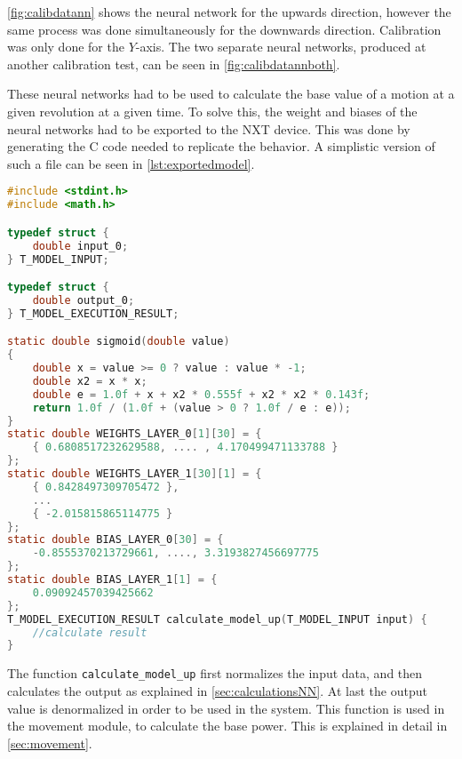 
\autoref{fig:calibdatann} shows the neural network for the upwards direction, however the same process was done simultaneously for the downwards direction.
Calibration was only done for the $Y$-axis.
The two separate neural networks, produced at another calibration test, can be seen in \autoref{fig:calibdatannboth}.



These neural networks had to be used to calculate the base value of a motion at a given revolution at a given time.
To solve this, the weight and biases of the neural networks had to be exported to the NXT device.
This was done by generating the C code needed to replicate the behavior.
A simplistic version of such a file can be seen in \autoref{lst:exportedmodel}.


\begin{lstlisting}[language=C,label={lst:exportedmodel},firstnumber={1},caption={Autogenerated model for getting power to move up}]
#include <stdint.h>
#include <math.h>

typedef struct {
	double input_0;
} T_MODEL_INPUT;

typedef struct {
	double output_0;
} T_MODEL_EXECUTION_RESULT;

static double sigmoid(double value)
{
	double x = value >= 0 ? value : value * -1;
	double x2 = x * x;
	double e = 1.0f + x + x2 * 0.555f + x2 * x2 * 0.143f;
	return 1.0f / (1.0f + (value > 0 ? 1.0f / e : e));
}
static double WEIGHTS_LAYER_0[1][30] = {
	{ 0.6808517232629588, .... , 4.170499471133788 }
};
static double WEIGHTS_LAYER_1[30][1] = {
	{ 0.8428497309705472 },
	...
	{ -2.015815865114775 }
};
static double BIAS_LAYER_0[30] = {
	-0.8555370213729661, ...., 3.3193827456697775
};
static double BIAS_LAYER_1[1] = {
	0.09092457039425662
};
T_MODEL_EXECUTION_RESULT calculate_model_up(T_MODEL_INPUT input) {
	//calculate result
}

\end{lstlisting}
The function \texttt{calculate\_model\_up} first normalizes the input data, and then calculates the output as explained in \ref{sec:calculationsNN}.
At last the output value is denormalized in order to be used in the system.
This function is used in the movement module, to calculate the base power.
This is explained in detail in \autoref{sec:movement}.


